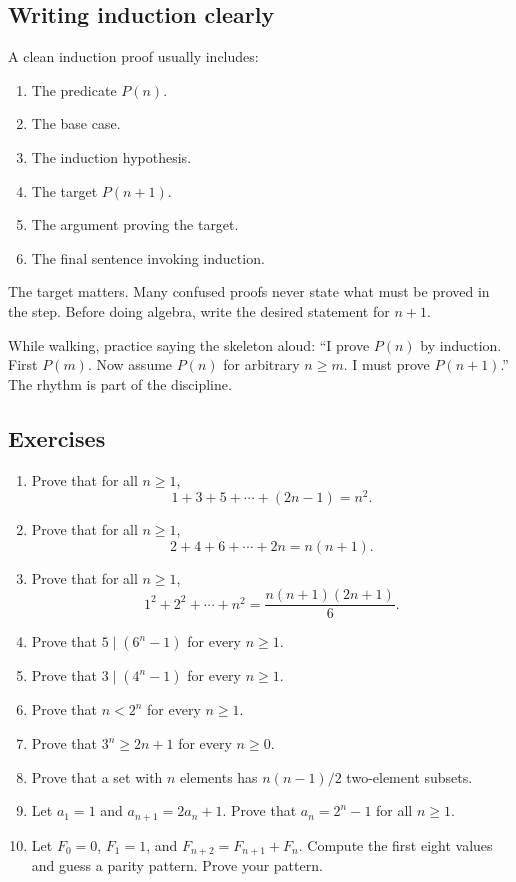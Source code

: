 \subsection{Writing induction clearly}

A clean induction proof usually includes:

\begin{enumerate}
\item The predicate $P(n)$.
\item The base case.
\item The induction hypothesis.
\item The target $P(n+1)$.
\item The argument proving the target.
\item The final sentence invoking induction.
\end{enumerate}

The target matters. Many confused proofs never state what must be proved in the step. Before doing algebra, write the desired statement for $n+1$.

\begin{walkbox}
While walking, practice saying the skeleton aloud: ``I prove $P(n)$ by induction. First $P(m)$. Now assume $P(n)$ for arbitrary $n\geq m$. I must prove $P(n+1)$.'' The rhythm is part of the discipline.
\end{walkbox}

\subsection{Exercises}

\begin{enumerate}
\item Prove that for all $n\geq1$,
\[
1+3+5+\cdots+(2n-1)=n^2.
\]
\item Prove that for all $n\geq1$,
\[
2+4+6+\cdots+2n=n(n+1).
\]
\item Prove that for all $n\geq1$,
\[
1^2+2^2+\cdots+n^2=\frac{n(n+1)(2n+1)}{6}.
\]
\item Prove that $5\mid(6^n-1)$ for every $n\geq1$.
\item Prove that $3\mid(4^n-1)$ for every $n\geq1$.
\item Prove that $n<2^n$ for every $n\geq1$.
\item Prove that $3^n\geq2n+1$ for every $n\geq0$.
\item Prove that a set with $n$ elements has $n(n-1)/2$ two-element subsets.
\item Let $a_1=1$ and $a_{n+1}=2a_n+1$. Prove that $a_n=2^n-1$ for all $n\geq1$.
\item Let $F_0=0$, $F_1=1$, and $F_{n+2}=F_{n+1}+F_n$. Compute the first eight values and guess a parity pattern. Prove your pattern.
\end{enumerate}


